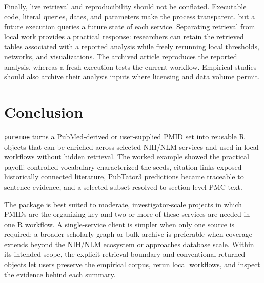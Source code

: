 Finally, live retrieval and reproducibility should not be conflated. Executable
code, literal queries, dates, and parameters make the process transparent, but
a future execution queries a future state of each service. Separating retrieval
from local work provides a practical response: researchers can retain the
retrieved tables associated with a reported analysis while freely
rerunning local thresholds, networks, and visualizations. The archived article
reproduces the reported analysis, whereas a fresh execution tests the current
workflow. Empirical studies should also archive their analysis inputs where
licensing and data volume permit.

\section{Conclusion}\label{conclusion}

\texttt{puremoe} turns a PubMed-derived or user-supplied PMID set into reusable R
objects that can be enriched across selected NIH/NLM services and used in local
workflows without hidden retrieval. The worked example showed the practical
payoff: controlled vocabulary characterized the seeds, citation links exposed
historically connected literature, PubTator3 predictions became traceable to
sentence evidence, and a selected subset resolved to section-level PMC text.

The package is best suited to moderate, investigator-scale projects in which
PMIDs are the organizing key and two or more of these services are needed in one
R workflow. A single-service client is simpler when only one source is required;
a broader scholarly graph or bulk archive is preferable when coverage extends
beyond the NIH/NLM ecosystem or approaches database scale. Within its intended
scope, the explicit retrieval boundary and conventional returned objects let
users preserve the empirical corpus, rerun local workflows, and inspect the
evidence behind each summary.



\address{%
Jason Timm\\
University of New Mexico Health Sciences\\%
Translational Informatics Division\\ Albuquerque, New Mexico, United States\\
%
\url{https://jaytimm.github.io/puremoe/}\\%
%
\href{mailto:jatimm@salud.unm.edu}{\nolinkurl{jatimm@salud.unm.edu}}%
}
